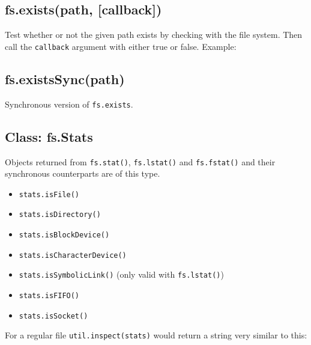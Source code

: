 \subsection{fs.exists(path, {[}callback{]})}

Test whether or not the given path exists by checking with the file
system. Then call the \texttt{callback} argument with either true or
false. Example:

\begin{Shaded}
\begin{Highlighting}[]
\NormalTok{(}\NormalTok{, } 
   \NormalTok{: }\NormalTok{);}
\NormalTok{\});}
\end{Highlighting}
\end{Shaded}

\subsection{fs.existsSync(path)}

Synchronous version of \texttt{fs.exists}.

\subsection{Class: fs.Stats}

Objects returned from \texttt{fs.stat()}, \texttt{fs.lstat()} and
\texttt{fs.fstat()} and their synchronous counterparts are of this type.

\begin{itemize}
\item
  \texttt{stats.isFile()}
\item
  \texttt{stats.isDirectory()}
\item
  \texttt{stats.isBlockDevice()}
\item
  \texttt{stats.isCharacterDevice()}
\item
  \texttt{stats.isSymbolicLink()} (only valid with \texttt{fs.lstat()})
\item
  \texttt{stats.isFIFO()}
\item
  \texttt{stats.isSocket()}
\end{itemize}

For a regular file \texttt{util.inspect(stats)} would return a string
very similar to this:

